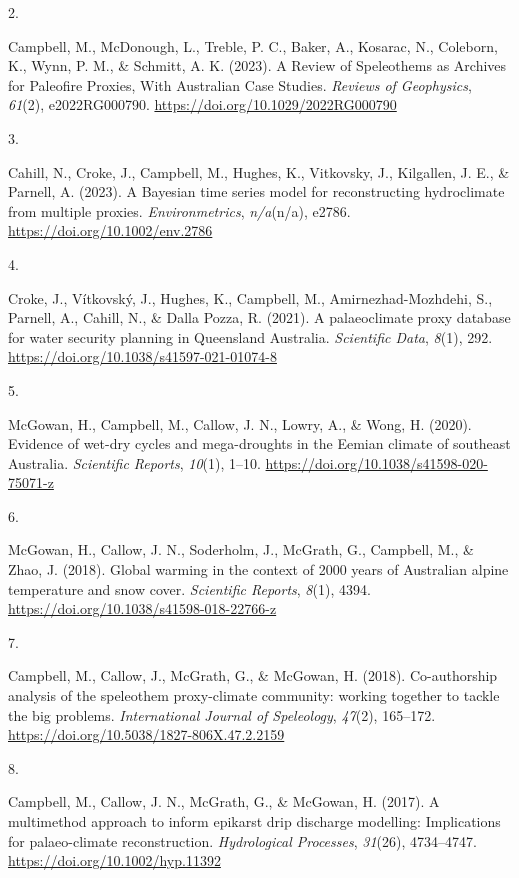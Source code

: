 \documentclass[11pt,a4paper,]{moderncv}
\newlength{\csllabelwidth}
\newcommand{\CSLLeftMargin}[1]{\parbox[t]{\csllabelwidth}{#1}}
\newcommand{\CSLRightInline}[1]{\parbox[t]{\linewidth - \csllabelwidth}{#1}}
\begin{document}
\leavevmode{}%
\CSLLeftMargin{2. }%
\CSLRightInline{Campbell, M., McDonough, L., Treble, P. C., Baker, A.,
Kosarac, N., Coleborn, K., Wynn, P. M., \& Schmitt, A. K. (2023). A
Review of Speleothems as Archives for Paleofire Proxies, With Australian
Case Studies. \emph{Reviews of Geophysics}, \emph{61}(2), e2022RG000790.
\url{https://doi.org/10.1029/2022RG000790}}

\leavevmode{}%
\CSLLeftMargin{3. }%
\CSLRightInline{Cahill, N., Croke, J., Campbell, M., Hughes, K.,
Vitkovsky, J., Kilgallen, J. E., \& Parnell, A. (2023). A Bayesian time
series model for reconstructing hydroclimate from multiple proxies.
\emph{Environmetrics}, \emph{n/a}(n/a), e2786.
\url{https://doi.org/10.1002/env.2786}}

\leavevmode{}%
\CSLLeftMargin{4. }%
\CSLRightInline{Croke, J., Vítkovský, J., Hughes, K., Campbell, M.,
Amirnezhad-Mozhdehi, S., Parnell, A., Cahill, N., \& Dalla Pozza, R.
(2021). A palaeoclimate proxy database for water security planning in
Queensland Australia. \emph{Scientific Data}, \emph{8}(1), 292.
\url{https://doi.org/10.1038/s41597-021-01074-8}}

\leavevmode{}%
\CSLLeftMargin{5. }%
\CSLRightInline{McGowan, H., Campbell, M., Callow, J. N., Lowry, A., \&
Wong, H. (2020). Evidence of wet-dry cycles and mega-droughts in the
Eemian climate of southeast Australia. \emph{Scientific Reports},
\emph{10}(1), 1--10. \url{https://doi.org/10.1038/s41598-020-75071-z}}

\leavevmode{}%
\CSLLeftMargin{6. }%
\CSLRightInline{McGowan, H., Callow, J. N., Soderholm, J., McGrath, G.,
Campbell, M., \& Zhao, J. (2018). Global warming in the context of 2000
years of Australian alpine temperature and snow cover. \emph{Scientific
Reports}, \emph{8}(1), 4394.
\url{https://doi.org/10.1038/s41598-018-22766-z}}

\leavevmode{}%
\CSLLeftMargin{7. }%
\CSLRightInline{Campbell, M., Callow, J., McGrath, G., \& McGowan, H.
(2018). Co-authorship analysis of the speleothem proxy-climate
community: working together to tackle the big problems.
\emph{International Journal of Speleology}, \emph{47}(2), 165--172.
\url{https://doi.org/10.5038/1827-806X.47.2.2159}}

\leavevmode{}%
\CSLLeftMargin{8. }%
\CSLRightInline{Campbell, M., Callow, J. N., McGrath, G., \& McGowan, H.
(2017). A multimethod approach to inform epikarst drip discharge
modelling: Implications for palaeo-climate reconstruction.
\emph{Hydrological Processes}, \emph{31}(26), 4734--4747.
\url{https://doi.org/10.1002/hyp.11392}}
\end{document}
